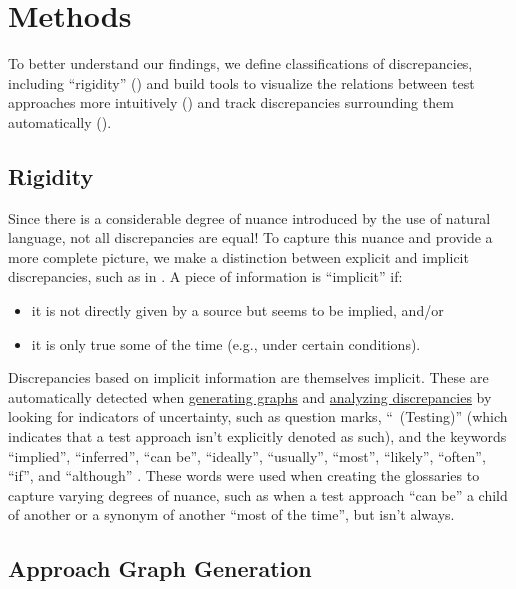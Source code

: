 \section{Methods}
\label{methods}

\newcommand{\autoDiscreps}[1][,]{discrepancies in \Cref{syns,par-rels},
    including \refDiscrepsTable{}#1}

To better understand our findings, we define classifications of discrepancies,
including ``rigidity'' () and build tools to visualize the
relations between test approaches more intuitively () and track
discrepancies surrounding them automatically ().

\subsection{Rigidity}
\label{rigidity}

Since there is a considerable degree of nuance introduced by the use of natural
language, not all discrepancies are equal! To capture this nuance and provide a
more complete picture, we make a distinction between explicit and implicit
discrepancies, such as in . A piece of information is
``implicit'' if:
\begin{itemize}
    \item it is not directly given by a source but seems to be implied, and/or
    \item it is only true some of the time (e.g., under certain conditions).
\end{itemize}
Discrepancies based on implicit information are themselves implicit. These are
automatically detected when \hyperref[graph-gen]{generating graphs} and
\hyperref[discrep-analysis]{analyzing discrepancies} by looking for indicators
of uncertainty, such as question marks, ``~(Testing)'' (which indicates
that a test approach isn't explicitly denoted as such), and the keywords
``implied'', ``inferred'', ``can be'', ``ideally'', ``usually'', ``most'',
``likely'', ``often'', ``if'', and ``although''
. These words were used when creating
the glossaries to capture varying degrees of nuance, such as when a test
approach ``can be'' a child of another or a synonym of another ``most of the
time'', but isn't always.

\subsection{Approach Graph Generation}
\label{graph-gen}

